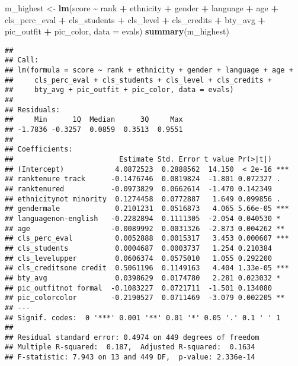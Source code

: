 \documentclass[
]{article}
\newenvironment{Shaded}{\begin{snugshade}}{\end{snugshade}}
\newcommand{\AttributeTok}[1]{\textcolor[rgb]{0.13,0.29,0.53}{#1}}
\newcommand{\FunctionTok}[1]{\textcolor[rgb]{0.13,0.29,0.53}{\textbf{#1}}}
\newcommand{\NormalTok}[1]{#1}
\newcommand{\OtherTok}[1]{\textcolor[rgb]{0.56,0.35,0.01}{#1}}
\newcommand{\SpecialCharTok}[1]{\textcolor[rgb]{0.81,0.36,0.00}{\textbf{#1}}}
\begin{document}
\begin{Shaded}
\begin{Highlighting}[]
\NormalTok{m\_highest }\OtherTok{\textless{}{-}} \FunctionTok{lm}\NormalTok{(score }\SpecialCharTok{\textasciitilde{}}\NormalTok{ rank }\SpecialCharTok{+}\NormalTok{ ethnicity }\SpecialCharTok{+}\NormalTok{ gender }\SpecialCharTok{+}\NormalTok{ language }\SpecialCharTok{+}\NormalTok{ age }\SpecialCharTok{+}\NormalTok{ cls\_perc\_eval }
             \SpecialCharTok{+}\NormalTok{ cls\_students }\SpecialCharTok{+}\NormalTok{ cls\_level }\SpecialCharTok{+}\NormalTok{ cls\_credits }\SpecialCharTok{+}\NormalTok{ bty\_avg }
             \SpecialCharTok{+}\NormalTok{ pic\_outfit }\SpecialCharTok{+}\NormalTok{ pic\_color, }\AttributeTok{data =}\NormalTok{ evals)}
\FunctionTok{summary}\NormalTok{(m\_highest)}
\end{Highlighting}
\end{Shaded}

\begin{verbatim}
## 
## Call:
## lm(formula = score ~ rank + ethnicity + gender + language + age + 
##     cls_perc_eval + cls_students + cls_level + cls_credits + 
##     bty_avg + pic_outfit + pic_color, data = evals)
## 
## Residuals:
##     Min      1Q  Median      3Q     Max 
## -1.7836 -0.3257  0.0859  0.3513  0.9551 
## 
## Coefficients:
##                         Estimate Std. Error t value Pr(>|t|)    
## (Intercept)            4.0872523  0.2888562  14.150  < 2e-16 ***
## ranktenure track      -0.1476746  0.0819824  -1.801 0.072327 .  
## ranktenured           -0.0973829  0.0662614  -1.470 0.142349    
## ethnicitynot minority  0.1274458  0.0772887   1.649 0.099856 .  
## gendermale             0.2101231  0.0516873   4.065 5.66e-05 ***
## languagenon-english   -0.2282894  0.1111305  -2.054 0.040530 *  
## age                   -0.0089992  0.0031326  -2.873 0.004262 ** 
## cls_perc_eval          0.0052888  0.0015317   3.453 0.000607 ***
## cls_students           0.0004687  0.0003737   1.254 0.210384    
## cls_levelupper         0.0606374  0.0575010   1.055 0.292200    
## cls_creditsone credit  0.5061196  0.1149163   4.404 1.33e-05 ***
## bty_avg                0.0398629  0.0174780   2.281 0.023032 *  
## pic_outfitnot formal  -0.1083227  0.0721711  -1.501 0.134080    
## pic_colorcolor        -0.2190527  0.0711469  -3.079 0.002205 ** 
## ---
## Signif. codes:  0 '***' 0.001 '**' 0.01 '*' 0.05 '.' 0.1 ' ' 1
## 
## Residual standard error: 0.4974 on 449 degrees of freedom
## Multiple R-squared:  0.187,  Adjusted R-squared:  0.1634 
## F-statistic: 7.943 on 13 and 449 DF,  p-value: 2.336e-14
\end{verbatim}
\end{document}
